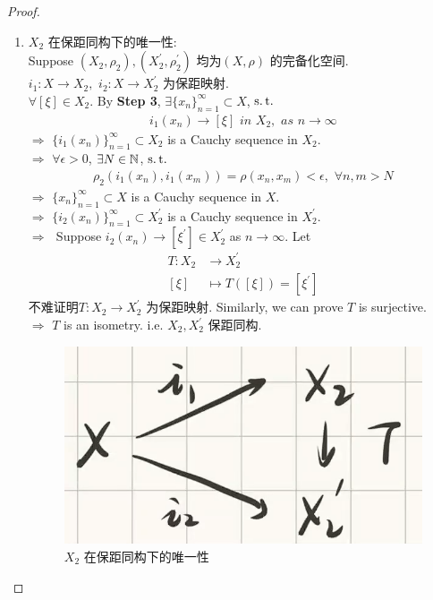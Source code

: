 \begin{thm}
\begin{proof}
\begin{enumerate}
				\item $X_2$ 在保距同构下的唯一性: \\
				Suppose $(X_2 , \rho_2), (X_2^{'} , \rho_{2}^{'})$ 均为$(X , \rho)$ 的完备化空间. $i_1 : X \rightarrow X_2 , \,\, i_2 : X \rightarrow X_{2}^{'}$ 为保距映射. \\
				$\forall [\xi] \in X_2$. By \textbf{Step 3}, $\exists \{ x_n \}_{n = 1}^{\infty} \subset X$, $\operatorname{s.t.}$
				\begin{align}
					i_{1}(x_n) \to [\xi] \,\, in \,\, X_2 , \,\, as \,\, n \to \infty
				\end{align}
				$\Rightarrow \,\, \{i_1(x_n)\}_{n = 1}^{\infty} \subset X_2$ is a Cauchy sequence in $X_2$. \\
				$\Rightarrow \,\, \forall \epsilon > 0$, $\exists N \in \mathbb{N}$, $\operatorname{s.t.}$
				\begin{align}
					\rho_2(i_1(x_n) , i_1(x_m)) = \rho(x_n , x_m) < \epsilon , \,\, \forall n , m > N
				\end{align}
				$\Rightarrow \,\, \{ x_n \}_{n = 1}^{\infty} \subset X$ is a Cauchy sequence in $X$. \\
				$\Rightarrow \,\, \{ i_2(x_n) \}_{n = 1}^{\infty} \subset X_2^{'}$ is a Cauchy sequence in $X_2^{'}$. \\
				$\Rightarrow \,\,$ Suppose $i_2(x_n) \to [\xi^{'}] \in X_2^{'}$ as $n \to \infty$. Let
				\begin{align}
					T : X_2 &\longrightarrow X_2^{'} \\
					[\xi] &\longmapsto T([\xi]) = [\xi^{'}]
				\end{align}
				不难证明$T : X_2 \rightarrow X_2^{'}$ 为保距映射. Similarly, we can prove $T$ is surjective. \\
				$\Rightarrow \,\, T$ is an isometry. i.e. $X_2 , X_2^{'}$ 保距同构.
				
				\begin{figure}[thbp!]
					\centering
					\includegraphics[width=0.4\linewidth]{figure/1.2.4-1}
					\caption{$X_2$ 在保距同构下的唯一性}
					\label{pic : 1.2.4-1} %
				\end{figure}
			\end{enumerate}
		\end{proof}
		

\end{thm}
